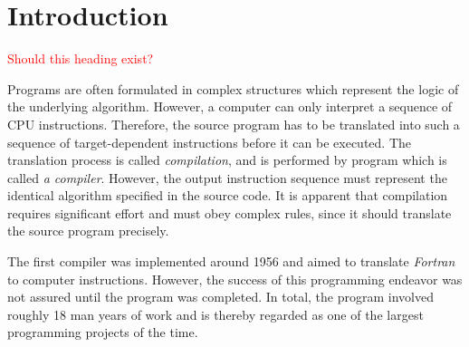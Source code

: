 \section*{Introduction}
\textcolor{red}{Should this heading exist?}

Programs are often formulated in complex structures which represent the logic of the underlying algorithm.
However, a computer can only interpret a sequence of CPU instructions.
Therefore, the source program has to be translated into such a sequence of target-dependent instructions before it can be executed.
The translation process is called \emph{compilation}, and is performed by program which is called \emph{a compiler}.
However, the output instruction sequence must represent the identical algorithm specified in the source code.
It is apparent that compilation requires significant effort and must obey complex rules,
since it should translate the source program precisely.

The first compiler was implemented around 1956 and aimed to translate \emph{Fortran} to computer instructions.
However, the success of this programming endeavor was not assured until the program was completed.
In total, the program involved roughly 18 man years of work
and is thereby regarded as one of the largest programming projects of the time.

